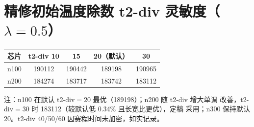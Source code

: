 \documentclass[12pt,a4paper]{article}
\begin{document}
\section{精修初始温度除数 t2-div 灵敏度（$\lambda=0.5$）}

\begin{table}[H]
\centering
\scriptsize
\setlength{\tabcolsep}{3pt}
\begin{tabular}{lcccc}
\toprule
芯片 & t2-div 10 & 15 & 20（默认） & 30 \\
\midrule

n100 & 190112 & 190442 & 189198 & 190965 \\
n200 & 184274 & 183717 & 183742 & 183112 \\
\bottomrule
\end{tabular}
\end{table}

注：n100 在默认 t2-div$=20$ 最优（189198）；n200 随 t2-div 增大单调
改善，t2-div$=30$ 时 183112（较默认低 0.34\% 且长宽比更优），定稿
采用；n300 保持默认 20。t2-div 40/50/60 因赛程时间未加密，如实记录。
\end{document}
